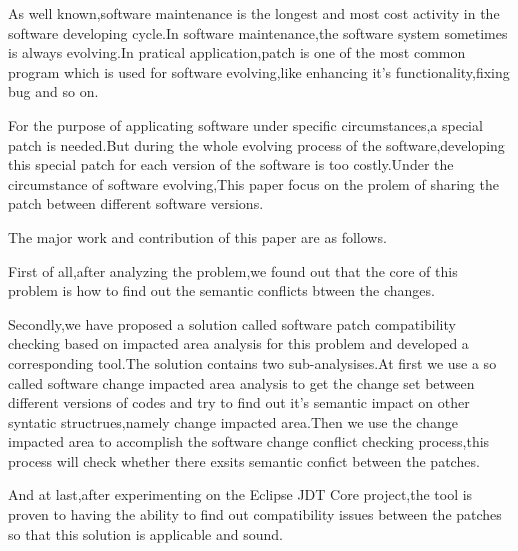 \begin{eabstract} 
		As well known,software maintenance is the longest and most cost activity in the software developing cycle.In software maintenance,the software system sometimes is always evolving.In pratical application,patch is one of the most common program which is used for software evolving,like enhancing it's functionality,fixing bug and so on.
		
		For the purpose of applicating software under specific circumstances,a special patch is needed.But during the whole evolving process of the software,developing this special patch for each version of the software is too costly.Under the circumstance of software evolving,This paper focus on the prolem of sharing the patch between different software versions.
		
		The major work and contribution of this paper are as follows.
		
		First of all,after analyzing the problem,we found out that the core of this problem is how to find out the semantic conflicts btween the changes.
		
		Secondly,we have proposed a solution called software patch compatibility checking based on impacted area analysis for this problem and developed a corresponding tool.The solution contains two sub-analysises.At first we use a so called software change impacted area analysis to get the change set between different versions of codes and try to find out it's semantic impact on other syntatic structrues,namely change impacted area.Then we use the change impacted area to accomplish the software change conflict checking process,this process will check whether there exsits semantic confict between the patches.
		
		And at last,after experimenting on the Eclipse JDT Core project,the tool is proven to having the ability to find out compatibility issues between the patches so that this solution is applicable and sound.
		
		

\end{eabstract}

